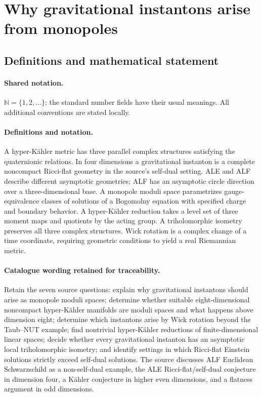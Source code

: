 \documentclass[11pt]{article}
\begin{document}
\section{Why gravitational instantons arise from monopoles}\label{statement}

\subsection{Definitions and mathematical statement}

\paragraph{Shared notation.}$\mathbb N=\{1,2,\ldots\}$; the standard number fields have their usual meanings. All additional conventions are stated locally.


\paragraph{Definitions and notation.}A hyper-Kähler metric has three parallel complex structures satisfying the quaternionic relations. In four dimensions a gravitational instanton is a complete noncompact Ricci-flat geometry in the source’s self-dual setting. ALE and ALF describe different asymptotic geometries; ALF has an asymptotic circle direction over a three-dimensional base. A monopole moduli space parametrizes gauge-equivalence classes of solutions of a Bogomolny equation with specified charge and boundary behavior. A hyper-Kähler reduction takes a level set of three moment maps and quotients by the acting group. A triholomorphic isometry preserves all three complex structures. Wick rotation is a complex change of a time coordinate, requiring geometric conditions to yield a real Riemannian metric.

\paragraph{Catalogue wording retained for traceability.}
Retain the seven source questions: explain why gravitational instantons should arise as monopole moduli spaces; determine whether suitable eight-dimensional noncompact hyper-Kähler manifolds are moduli spaces and what happens above dimension eight; determine which instantons arise by Wick rotation beyond the Taub--NUT example; find nontrivial hyper-Kähler reductions of finite-dimensional linear spaces; decide whether every gravitational instanton has an asymptotic local triholomorphic isometry; and identify settings in which Ricci-flat Einstein solutions strictly exceed self-dual solutions. The source discusses ALF Euclidean Schwarzschild as a non-self-dual example, the ALE Ricci-flat/self-dual conjecture in dimension four, a Kähler conjecture in higher even dimensions, and a flatness argument in odd dimensions.
\end{document}
